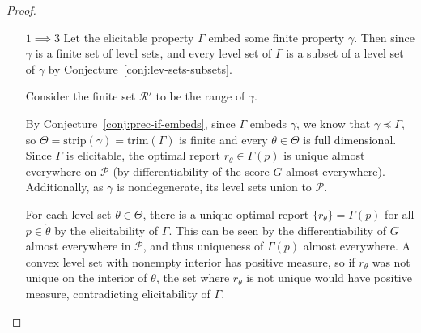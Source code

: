 \documentclass[12pt]{article}
\newcommand{\Comments}{1}
\newcommand{\mynote}[2]{\ifnum\Comments=1\textcolor{#1}{#2}\fi}
\newcommand{\jessie}[1]{\mynote{purple}{[JF: #1]}}
\renewcommand{\P}{\mathcal{P}}
\newcommand{\R}{\mathcal{R}}
\newcommand{\inter}[1]{\mathring{#1}}%
\newcommand{\trim}{\mathrm{trim}}
\newcommand{\strip}{\mathrm{strip}}
\begin{document}
\begin{proof}
\begin{enumerate}


\item[$1 \implies 3$] 
Let the elicitable property $\Gamma$ embed some finite property $\gamma$.
Then since $\gamma$ is a finite set of level sets, and every level set of $\Gamma$ is a subset of a level set of $\gamma$ by Conjecture~\ref{conj:lev-sets-subsets}.

Consider the finite set $\R'$ to be the range of $\gamma$.

By Conjecture~\ref{conj:prec-if-embeds}, since $\Gamma$ embeds $\gamma$, we know that $\gamma \preceq \Gamma$, so $\Theta = \strip(\gamma) = \trim(\Gamma)$ is finite and every $\theta \in \Theta$ is full dimensional.
Since $\Gamma$ is elicitable, the optimal report $r_\theta \in \Gamma(p)$ is unique almost everywhere on $\P$ (by differentiability of the score $G$ almost everywhere).
Additionally, as $\gamma$ is nondegenerate, its level sets union to $\P$.

For each level set $\theta \in \Theta$, there is a unique optimal report $\{r_\theta \} = \Gamma(p)$ for all $p \in \inter{\theta}$ by the elicitability of $\Gamma$.
This can be seen by the differentiability of $G$ almost everywhere in $\P$, and thus uniqueness of $\Gamma(p)$ almost everywhere.
A convex level set with nonempty interior has positive measure, so if $r_\theta$ was not unique on the interior of $\theta$, the set where $r_\theta$ is not unique would have positive measure, contradicting elicitability of $\Gamma.$


\end{enumerate}
\end{proof}
\end{document}

